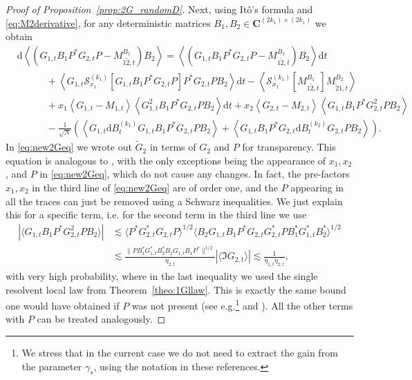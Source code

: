 \documentclass[10pt]{amsart}
\numberwithin{equation}{section}
\newcommand{\dif}{\mathrm{d}}
\newcommand{\C}{\mathbf{C}}
\begin{document}
\begin{proof}[Proof of Proposition~\ref{prop:2G_randomD}]
Next, using It\^{o}'s formula and \eqref{eq:M2derivative}, for any deterministic matrices $B_1,B_2\in\C^{(2k_1)\times (2k_1)}$ we obtain 
\begin{equation}
\begin{split}
\label{eq:new2Geq}
&\dif \left\langle (G_{1,t}B_1P^*G_{2,t}P-M_{1\widetilde{2},t}^{B_1})B_2\right\rangle = \left\langle (G_{1,t}B_1P^*G_{2,t}P-M_{1\widetilde{2},t}^{B_1})B_2\right\rangle \dif t \\
&\qquad\quad+ \left\langle G_{1,t}\mathcal{S}^{(k_1)}_{x_1}\left[ G_{1,t}B_1P^*G_{2,t}P\right] P^*G_{2,t}PB_2\right\rangle\dif t-\left\langle \mathcal{S}^{(k_1)}_{x_1}\left[M_{1\widetilde{2},t}^{B_1}\right] M_{\widetilde{2}1,t}^{B_2}\right\rangle\\
&\qquad\quad+ x_1\left\langle G_{1,t}-M_{1,t}\right\rangle \left\langle G_{1,t}^2 B_1P^*G_{2,t}PB_2\right\rangle \dif t + x_2\left\langle G_{2,t}-M_{2,t}\right\rangle \left\langle G_{1,t}B_1P^*G_{2,t}^2PB_2\right\rangle\\
&\qquad\quad- \frac{1}{\sqrt{N}}\left(\left\langle G_{1,t}\dif B^{(k_1)}_tG_{1,t}B_1P^*G_{2,t}PB_2\right\rangle + \left\langle G_{1,t}B_1P^*G_{2,t}\dif B_t^{(k_2)}G_{2,t}PB_2\right\rangle\right).
\end{split}
\end{equation}
In \eqref{eq:new2Geq} we wrote out $\widetilde{G}_2$ in terms of $G_2$ and $P$ for transparency. This equation is analogous to \cite[Eq.(4.20)]{nonHermdecay}, with the only exceptions being the appearance of $x_1, x_2$, and $P$ in \eqref{eq:new2Geq}, which do not cause any changes. In fact, the pre-factors $x_1,x_2$ in the third line of \eqref{eq:new2Geq} are of order one, and the $P$ appearing in all the traces can just be removed using a Schwarz inequalities. We just explain this for a specific term, i.e. for the second term in the third line we use 
\begin{equation}
\begin{split}
\left\vert\langle G_{1,t}B_1P^*G_{2,t}^2PB_2\rangle \right\vert &\lesssim \langle P^*G_{2,t}^* G_{2,t}P\rangle^{1/2} \langle B_2G_{1,t}B_1P^*G_{2,t}G_{2,t}^*PB_1^*G_{1,t}^*B_2^*\rangle^{1/2}\\
&\lesssim \frac{\lVert PB_1^*G_{1,t}^*B_2^*B_2G_{1,t}B_1P^*\rVert^{1/2}}{\eta_{2,t}}\left\vert\langle \Im G_{2,t}\rangle\right\vert\lesssim \frac{1}{\eta_{1,t}\eta_{2,t}},
\end{split}
\label{eq:propagator_entries}
\end{equation}
with very high probability, where in the last inequality we used the single resolvent local law from Theorem~\ref{theo:1Gllaw}. This is exactly the same bound one would have obtained if $P$ was not present (see e.g.\footnote{We stress that in the current case we do not need to extract the gain from the parameter $\gamma_s$, using the notation in these references.} \cite[Eq.(4.25)]{nonHermdecay} and \cite[Eq.(5.40)]{univ_extr}). All the other terms with $P$ can be treated analogously. 


\end{proof}
\end{document}

